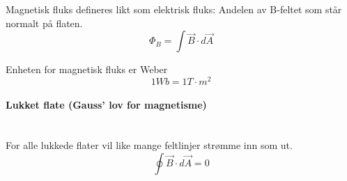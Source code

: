 Magnetisk fluks defineres likt som elektrisk fluks:
Andelen av B-feltet som står normalt på flaten.
$$\Phi_B = \int \vec{B}\cdot d\vec{A}$$

Enheten for magnetisk fluks er Weber
$$1Wb = 1T\cdot m^2$$



\paragraph{Lukket flate (Gauss' lov for magnetisme)} \hfill \\
For alle lukkede flater vil like mange feltlinjer strømme inn som ut.
$$\oint \vec{B}\cdot d\vec{A} = 0$$
